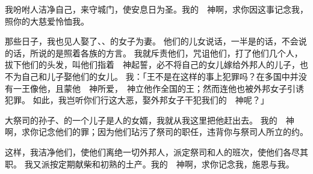 {我吩咐{}人洁净自己，来守城门，使安息日为圣。我的　神啊，求你因这事记念我，照你的大慈爱怜恤我。
\par }{\PP {}那些日子，我也见{}人娶了{}、{}、{}的女子为妻。
他们的儿女说话，一半是{}的话，不会说{}的话，所说的是照着各族的方言。
我就斥责他们，咒诅他们，打了他们几个人，拔下他们的头发，叫他们指着　神起誓，必不将自己的女儿嫁给外邦人的儿子，也不为自己和儿子娶他们的女儿。
我{}：「{}王{}不是在这样的事上犯罪吗？在多国中并没有一王像他，且蒙他　神所爱，　神立他作{}全国的王；然而连他也被外邦女子引诱犯罪。
如此，我岂听你们行这大恶，娶外邦女子干犯我们的　神呢？」
\par }{\PP {}大祭司{}的孙子、{}的一个儿子是{}人{}的女婿，我就从我这里把他赶出去。
我的　神啊，求你记念他们的罪；因为他们玷污了祭司的职任，违背你与祭司{}人所立的约。
\par }{\PP {}这样，我洁净他们，使他们离绝一切外邦人，派定祭司和{}人的班次，使他们各尽其职。
我又派{}按定期献柴和初熟的土产。我的　神啊，求你记念我，施恩与我。
\par }